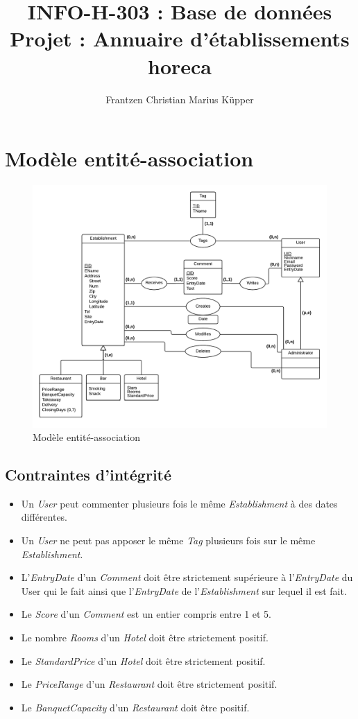 \documentclass[11pt,a4paper]{report}
\author{Frantzen Christian Marius Küpper}
\title{INFO-H-303 : Base de données\\
		Projet : Annuaire d'établissements horeca}
\begin{document}
\maketitle
\section*{Modèle entité-association}

\begin{figure}[h]
  \centering
  \includegraphics[width=\textwidth]{modelEA.pdf}
  \caption{Modèle entité-association}
\end{figure}


\subsection*{Contraintes d'intégrité}

\begin{itemize}
\item Un \textit{User} peut commenter plusieurs fois le même \textit{Establishment} à des dates différentes. 
\item Un \textit{User} ne peut pas apposer le même \textit{Tag} plusieurs fois sur le même \textit{Establishment}. 
\item L'\textit{EntryDate} d'un \textit{Comment} doit être strictement supérieure à l'\textit{EntryDate} du User qui le fait ainsi que l'\textit{EntryDate} de l'\textit{Establishment} sur lequel il est fait. 
\item Le \textit{Score} d'un \textit{Comment} est un entier compris entre 1 et 5.
\item Le nombre \textit{Rooms} d'un \textit{Hotel} doit être strictement positif. 
\item Le \textit{StandardPrice} d'un \textit{Hotel} doit être strictement positif. 
\item Le \textit{PriceRange} d'un \textit{Restaurant} doit être strictement positif. 
\item Le \textit{BanquetCapacity} d'un \textit{Restaurant} doit être positif. 
\end{itemize}
\end{document}
